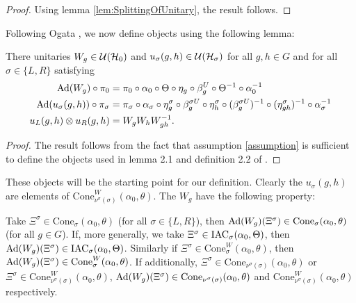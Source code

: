 \documentclass[11pt,a4paper,twoside]{article}
\numberwithin{equation}{section}
\begin{document}
	\begin{proof}
		Using lemma \ref{lem:SplittingOfUnitary}, the result follows.
	\end{proof}
	Following Ogata \cite{ogata2021h3gmathbb}, we now define objects using the following lemma:
	\begin{lemma}\label{lem:Definition_W_And_u}
		There unitaries $W_g\in\mathcal U(\mathcal H_0)$ and $u_{\sigma}(g,h)\in\mathcal U(\mathcal H_{\sigma})$ for all $g,h\in G$ and for all $\sigma\in\{L,R\}$ satisfying
		\begin{align}
			\nonumber
			\Ad{W_g}\circ\pi_0&=\pi_0\circ\alpha_0\circ\Theta\circ\eta_g\circ\beta_g^U\circ\Theta^{-1}\circ\alpha_0^{-1}\\
			\Ad{u_\sigma(g,h)}\circ\pi_\sigma&=\pi_\sigma\circ\alpha_\sigma\circ\eta_g^\sigma\circ\beta_g^{\sigma U}\circ\eta_h^{\sigma}\circ(\beta_g^{\sigma U})^{-1}\circ(\eta^\sigma_{gh})^{-1}\circ\alpha_\sigma^{-1}\\
			\nonumber
			u_L(g,h)\otimes u_R(g,h)&=W_gW_hW_{gh}^{-1}.
		\end{align}
	\end{lemma}
	\begin{proof}
		The result follows from the fact that assumption \ref{assumption} is sufficient to define the objects used in lemma 2.1 and definition 2.2 of \cite{ogata2021h3gmathbb}.
	\end{proof}
	These objects will be the starting point for our definition. Clearly the $u_\sigma(g,h)$ are elements of $\textrm{Cone}_{\nu^\sigma(\sigma)}^W(\alpha_0,\theta)$. The $W_g$ have the following property:
	\begin{lemma}\label{lem:AdjointOverConeIsInCone}
		Take $\Xi^{\sigma}\in\textrm{Cone}_\sigma(\alpha_0,\theta)$ (for all $\sigma\in\{L,R\}$), then $\Ad{W_g}(\Xi^\sigma)\in\textrm{Cone}_\sigma(\alpha_0,\theta)$ (for all $g\in G$). If, more generally, we take $\Xi^\sigma\in\textrm{IAC}_\sigma(\alpha_0,\Theta)$, then $\Ad{W_g}(\Xi^\sigma)\in\IAC_\sigma(\alpha_0,\Theta)$. Similarly if $\Xi^{\sigma}\in\textrm{Cone}_\sigma^W(\alpha_0,\theta)$, then $\Ad{W_g}(\Xi^\sigma)\in\textrm{Cone}_\sigma^W(\alpha_0,\theta)$. If additionally, $\Xi^{\sigma}\in\textrm{Cone}_{\nu^\sigma(\sigma)}(\alpha_0,\theta)$ or $\Xi^{\sigma}\in\textrm{Cone}_{\nu^\sigma(\sigma)}^W(\alpha_0,\theta)$, $\Ad{W_g}(\Xi^\sigma)\in\textrm{Cone}_{\nu^\sigma(\sigma)}(\alpha_0,\theta)$ and $\textrm{Cone}_{\nu^\sigma(\sigma)}^W(\alpha_0,\theta)$ respectively.
	\end{lemma}
\end{document}
